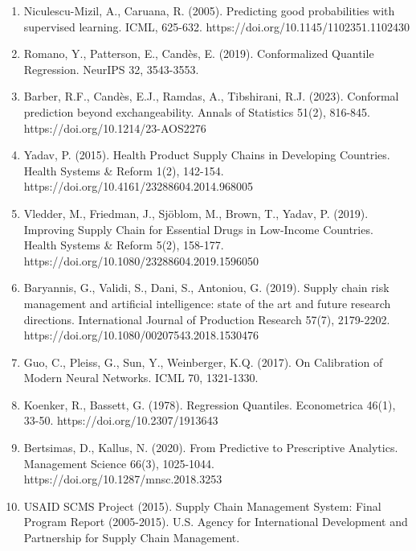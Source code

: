 \documentclass[
]{article}
\begin{document}
\begin{enumerate}
\item
  Niculescu-Mizil, A., Caruana, R. (2005). Predicting good probabilities
  with supervised learning. ICML, 625-632.
  https://doi.org/10.1145/1102351.1102430
\item
  Romano, Y., Patterson, E., Candès, E. (2019). Conformalized Quantile
  Regression. NeurIPS 32, 3543-3553.
\item
  Barber, R.F., Candès, E.J., Ramdas, A., Tibshirani, R.J. (2023).
  Conformal prediction beyond exchangeability. Annals of Statistics
  51(2), 816-845. https://doi.org/10.1214/23-AOS2276
\item
  Yadav, P. (2015). Health Product Supply Chains in Developing
  Countries. Health Systems \& Reform 1(2), 142-154.
  https://doi.org/10.4161/23288604.2014.968005
\item
  Vledder, M., Friedman, J., Sjöblom, M., Brown, T., Yadav, P. (2019).
  Improving Supply Chain for Essential Drugs in Low-Income Countries.
  Health Systems \& Reform 5(2), 158-177.
  https://doi.org/10.1080/23288604.2019.1596050
\item
  Baryannis, G., Validi, S., Dani, S., Antoniou, G. (2019). Supply chain
  risk management and artificial intelligence: state of the art and
  future research directions. International Journal of Production
  Research 57(7), 2179-2202.
  https://doi.org/10.1080/00207543.2018.1530476
\item
  Guo, C., Pleiss, G., Sun, Y., Weinberger, K.Q. (2017). On Calibration
  of Modern Neural Networks. ICML 70, 1321-1330.
\item
  Koenker, R., Bassett, G. (1978). Regression Quantiles. Econometrica
  46(1), 33-50. https://doi.org/10.2307/1913643
\item
  Bertsimas, D., Kallus, N. (2020). From Predictive to Prescriptive
  Analytics. Management Science 66(3), 1025-1044.
  https://doi.org/10.1287/mnsc.2018.3253
\item
  USAID SCMS Project (2015). Supply Chain Management System: Final
  Program Report (2005-2015). U.S. Agency for International Development
  and Partnership for Supply Chain Management.
\end{enumerate}
\end{document}

